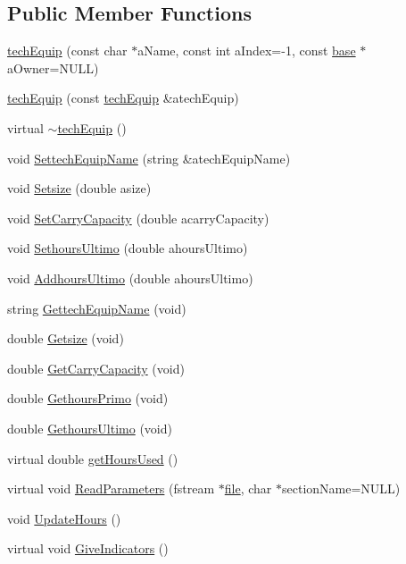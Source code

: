 \subsection*{Public Member Functions}
\begin{DoxyCompactItemize}
\item 
\hyperlink{classtech_equip_abb990aaba6e93883b64ab4b60a5cf669}{techEquip} (const char $\ast$aName, const int aIndex=-\/1, const \hyperlink{classbase}{base} $\ast$aOwner=NULL)
\item 
\hyperlink{classtech_equip_a17d3eba5034ecbb6049add3df96bf876}{techEquip} (const \hyperlink{classtech_equip}{techEquip} \&atechEquip)
\item 
virtual \hyperlink{classtech_equip_a602031975a6d2bd66828cc60649352fb}{$\sim$techEquip} ()
\item 
void \hyperlink{classtech_equip_a9593d2ee5545ea9157b43f5671c969b3}{SettechEquipName} (string \&atechEquipName)
\item 
void \hyperlink{classtech_equip_acd8e16736cfa57ee38bee4d9dad7e9de}{Setsize} (double asize)
\item 
void \hyperlink{classtech_equip_a4d3ba991907cd0a57ad5fb8770152874}{SetCarryCapacity} (double acarryCapacity)
\item 
void \hyperlink{classtech_equip_a3bdac847c7f243a4603fb9569c9b264e}{SethoursUltimo} (double ahoursUltimo)
\item 
void \hyperlink{classtech_equip_a276361ce65a8d7ceca469528c115b5e0}{AddhoursUltimo} (double ahoursUltimo)
\item 
string \hyperlink{classtech_equip_a1e2bcb0feb27e525bdec3f5f114e5a80}{GettechEquipName} (void)
\item 
double \hyperlink{classtech_equip_a907fd8953798aa945098332d20366166}{Getsize} (void)
\item 
double \hyperlink{classtech_equip_ae2b82293558dbb80274f62931b8cb49c}{GetCarryCapacity} (void)
\item 
double \hyperlink{classtech_equip_aa1d824dcc6a0b20bf896a4e9a63542ae}{GethoursPrimo} (void)
\item 
double \hyperlink{classtech_equip_a3b755c4eb6c71bb00b3cf745cd2d3c19}{GethoursUltimo} (void)
\item 
virtual double \hyperlink{classtech_equip_ad9c0cb0fabe3820710f162991bcd7e9a}{getHoursUsed} ()
\item 
virtual void \hyperlink{classtech_equip_a7b8543a8ead2be2a6a00d80123895e2c}{ReadParameters} (fstream $\ast$\hyperlink{classbase_a3af52ee9891719d09b8b19b42450b6f6}{file}, char $\ast$sectionName=NULL)
\item 
void \hyperlink{classtech_equip_a8c55f7cfece19df5ab98ee219b3cec0f}{UpdateHours} ()
\item 
virtual void \hyperlink{classtech_equip_aa7884f75fe1cd006153266ee913f9c08}{GiveIndicators} ()
\end{DoxyCompactItemize}
